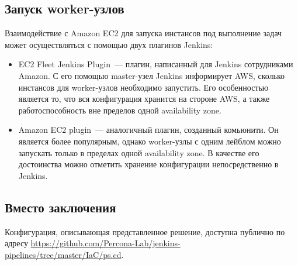 \documentclass[10pt, a5paper]{article}
\begin{document}
\subsection*{Запуск worker-узлов}

Взаимодействие с Amazon EC2 для запуска инстансов под выполнение задач может осуществляться с помощью двух плагинов Jenkins:

\begin{itemize}
  \item EC2 Fleet Jenkins Plugin~--- плагин, написанный для Jenkins сотрудниками Amazon. С его помощью master-узел Jenkins информирует AWS, сколько инстансов для worker-узлов необходимо запустить. Его особенностью является то, что вся конфигурация хранится на стороне AWS, а также работоспособность вне пределов одной availability zone.
  \item Amazon EC2 plugin~--- аналогичный плагин, созданный комьюнити. Он является более популярным, однако worker-узлы с одним лейблом можно запускать только в пределах одной availability zone. В качестве его достоинства можно отметить хранение конфигурации непосредственно в Jenkins.
\end{itemize}

\subsection*{Вместо заключения}

Конфигурация, описывающая представленное решение, доступна публично по адресу \url{https://github.com/Percona-Lab/jenkins-} \url{pipelines/tree/master/IaC/ps.cd}.
\end{document}
